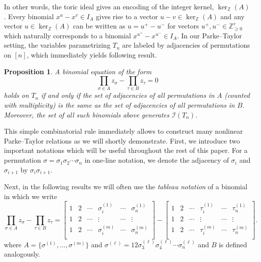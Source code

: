 \documentclass[12pt, reqno]{amsart}
\numberwithin{equation}{section}
\theoremstyle{plain}
\newtheorem{proposition}[theorem]{Proposition}
\theoremstyle{definition}
\newcommand{\zz}{\mathbb{Z}}
\newcommand{\ci}{\mathcal{I}}
\begin{document}
In other words, the toric ideal gives an encoding of the integer kernel, $\ker_\zz(A)$. Every binomial $x^{u} - x^v \in I_A$ gives rise to a vector $u - v \in \ker_\zz(A)$ and any vector $u \in \ker_\zz(A)$ can be written as $u = u^+ - u^-$ for vectors $u^+, u^- \in \zz_{\geq 0}^r$ which naturally corresponds to a binomial $x^{u^+} - x^{u^-} \in I_A$. In our Parke--Taylor setting, the variables parametrizing $T_n$ are labeled by adjacencies of permutations on $[n]$, which immediately yields following result.

\begin{proposition}
\label{prop:toric-gens-via-adjs}
A binomial equation of the form 
$$\prod\limits_{\sigma\in A} z_\sigma - \prod\limits_{\tau\in B} z_\tau = 0$$
holds on $T_n$ if and only if the set of adjacencies of all permutations in $A$ (counted with multiplicity) is the same as the set of adjacencies of all permutations in $B$. Moreover, the set of all such binomials above generates $\ci(T_n)$. 
\end{proposition}

This simple combinatorial rule immediately allows to construct many nonlinear Parke--Taylor relations as we will shortly demonstrate. First, we introduce two important notations which will be useful throughout the rest of this paper. For a permutation $\sigma = \sigma_1 \sigma_2 \cdots \sigma_n$ in one-line notation, we denote the adjacency of $\sigma_i$ and $\sigma_{i+1}$ by $\sigma_{i}\sigma_{i+1}$.

Next, in the following results we will often use the \emph{tableau notation} of a binomial in which we write
\[
\prod\limits_{\sigma\in A} z_\sigma - \prod\limits_{\tau\in B} z_\tau = 
\begin{bmatrix}
1 & 2 & \cdots & \sigma_i^{(1)} &  \cdots & \sigma_n^{(1)} \\
1 & 2 & \cdots & \vdots         & \cdots & \vdots  \\
1 & 2 & \cdots & \sigma_i^{(m)} & \cdots & \sigma_n^{(m)} \\
\end{bmatrix} - 
\begin{bmatrix}
1 & 2 & \cdots & \tau_i^{(1)} & \cdots & \tau_n^{(1)} \\
1 & 2 & \cdots & \vdots       & \cdots & \vdots  \\
1 & 2 & \cdots & \tau_i^{(m)} & \cdots & \tau_n^{(m)} \\
\end{bmatrix}. 
\]
where $A = \{\sigma^{(1)}, \ldots, \sigma^{(m)}\}$ and $\sigma^{(\ell)} = 12\sigma_{3}^{(\ell)}\sigma_{4}^{(\ell)}\cdots\sigma_{n}^{(\ell)}$ and $B$ is defined analogously. 
\end{document}

